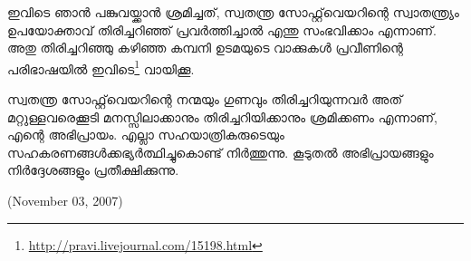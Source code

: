 ഇവിടെ ഞാന്‍ പങ്കുവയ്ക്കാന്‍ ശ്രമിച്ചത്, സ്വതന്ത്ര സോഫ്റ്റ്‌വെയറിന്റെ സ്വാതന്ത്ര്യം ഉപയോക്താവ് തിരിച്ചറിഞ്ഞ് പ്രവര്‍ത്തിച്ചാല്‍ എന്തു സംഭവിക്കാം എന്നാണ്. അതു തിരിച്ചറിഞ്ഞു കഴിഞ്ഞ കമ്പനി ഉടമയുടെ വാക്കുകള്‍ പ്രവീണിന്റെ പരിഭാഷയില്‍ ഇവിടെ\footnote{\url{http://pravi.livejournal.com/15198.html}} വായിക്കൂ.

സ്വതന്ത്ര സോഫ്റ്റ്‌വെയറിന്റെ നന്മയും ഗുണവും തിരിച്ചറിയുന്നവര്‍ അത് മറ്റുള്ളവരെക്കൂടി മനസ്സിലാക്കാനും തിരിച്ചറിയിക്കാനും ശ്രമിക്കണം എന്നാണ്, എന്റെ അഭിപ്രായം. 
എല്ലാ സഹയാത്രികരുടെയും സഹകരണങ്ങള്‍ക്കഭ്യര്‍ത്ഥിച്ചുകൊണ്ട് നിര്‍ത്തുന്നു. കൂടുതല്‍ അഭിപ്രായങ്ങളും നിര്‍ദ്ദേശങ്ങളും പ്രതീക്ഷിക്കുന്നു.

(November 03, 2007)
\newpage
